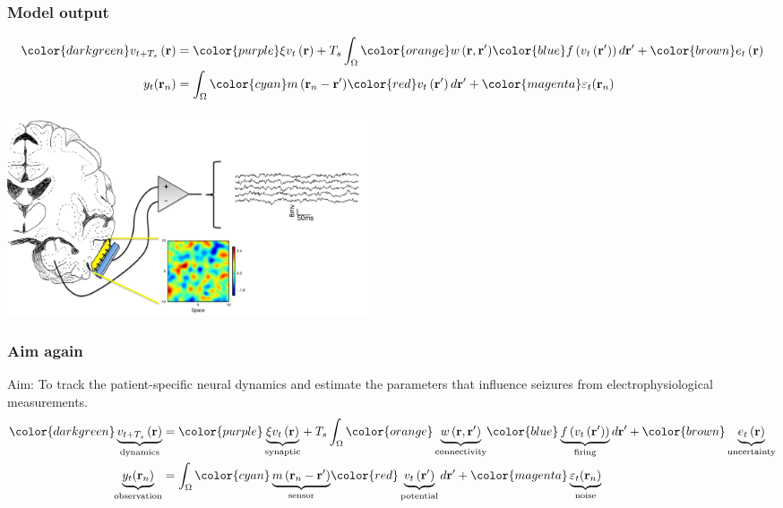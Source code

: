 \documentclass[compress]{beamer}
\begin{document}
\begin{frame}\frametitle{Model output}
	\begin{align}
		{\color{darkgreen}v_{t+T_s}\left(\mathbf{r}\right)} &= 
		{\color{purple}\xi v_t\left(\mathbf{r}\right)} + 
		T_s \int_\Omega { 
		    {\color{orange}w\left(\mathbf{r},\mathbf{r}'\right)}
		    {\color{blue}f\left(v_t\left(\mathbf{r}'\right)\right)} 
		\, d\mathbf{r}'} 
		+ {\color{brown}e_t\left(\mathbf{r}\right)} \nonumber \\
		y_t(\mathbf{r}_n) &= \int_{\Omega} { {\color{cyan}m\left(\mathbf{r}_n-\mathbf{r}'\right)} {\color{red}v_t\left(\mathbf{r}'\right)} \, d\mathbf{r}'} + {\color{magenta}\varepsilon_t(\mathbf{r}_n)} \nonumber 
	\end{align}
\begin{center} 
\includegraphics[height=6cm]{./Figures/ModelOutput.pdf}
\end{center}
\end{frame}



\begin{frame}\frametitle{Aim again}
Aim: To track the patient-specific neural dynamics and estimate the parameters that influence seizures from electrophysiological measurements.
\begin{align}
	{\color{darkgreen} \underbrace{v_{t+T_s}\left(\mathbf{r}\right)}_{\text{dynamics}}} &= 
	{\color{purple}\underbrace{\xi v_t\left(\mathbf{r}\right)}_{\text{synaptic}}} + 
	T_s \int_\Omega { 
	    {\color{orange}\underbrace{w\left(\mathbf{r},\mathbf{r}'\right)}_{\text{connectivity}}}
	    {\color{blue}\underbrace{f\left(v_t\left(\mathbf{r}'\right)\right)}_{\text{firing}}} 
	\, d\mathbf{r}'} 
	+ {\color{brown}\underbrace{e_t\left(\mathbf{r}\right)}_{\text{uncertainty}}} \nonumber \\
	\underbrace{y_t(\mathbf{r}_n)}_{\text{observation}} &= \int_{\Omega} { {\color{cyan}\underbrace{m\left(\mathbf{r}_n-\mathbf{r}'\right)}_{\text{sensor}}} {\color{red}\underbrace{v_t\left(\mathbf{r}'\right)}_{\text{potential}}} \, d\mathbf{r}'} + {\color{magenta}\underbrace{\varepsilon_t(\mathbf{r}_n)}_{\text{noise}}} \nonumber 
\end{align}
\end{frame}
\end{document}
